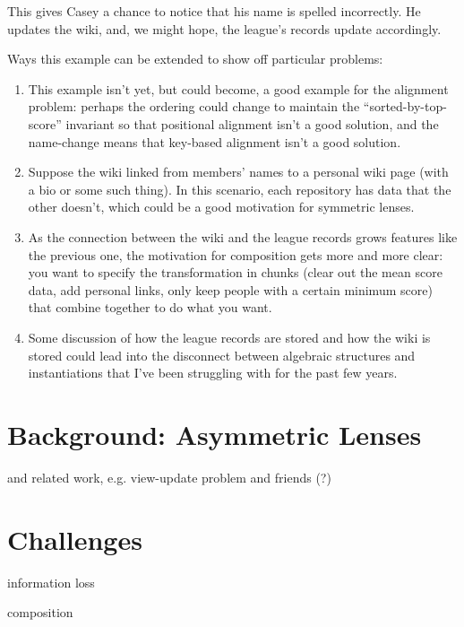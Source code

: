 \documentclass[12pt]{report}
\numberwithin{equation}{section}
\begin{document}
This gives Casey a chance to notice that his name is spelled incorrectly. He
updates the wiki, and, we might hope, the league's records update
accordingly.

Ways this example can be extended to show off particular problems:
\begin{enumerate}
    \item This example isn't yet, but could become, a good example for the
        alignment problem: perhaps the ordering could change to maintain the
        ``sorted-by-top-score'' invariant so that positional alignment isn't
        a good solution, and the name-change means that key-based alignment
        isn't a good solution.

    \item Suppose the wiki linked from members' names to a personal wiki
        page (with a bio or some such thing). In this scenario, each
        repository has data that the other doesn't, which could be a good
        motivation for symmetric lenses.

    \item As the connection between the wiki and the league records grows
        features like the previous one, the motivation for composition gets
        more and more clear: you want to specify the transformation in
        chunks (clear out the mean score data, add personal links, only keep
        people with a certain minimum score) that combine together to do
        what you want.

    \item Some discussion of how the league records are stored and how the
        wiki is stored could lead into the disconnect between algebraic
        structures and instantiations that I've been struggling with for the
        past few years.
\end{enumerate}

\chapter{Background: Asymmetric Lenses}

and related work, e.g. view-update problem and friends (?)

\chapter{Challenges}

information loss

composition
\end{document}
